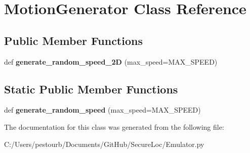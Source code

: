 \hypertarget{class_emulator_1_1_motion_generator}{}\section{Motion\+Generator Class Reference}
\label{class_emulator_1_1_motion_generator}
\subsection*{Public Member Functions}
\begin{DoxyCompactItemize}
\item 
\mbox{\label{class_emulator_1_1_motion_generator_ae846cfa9ceebef5acb7e1b8ea109f55a}} 
def {\bfseries generate\+\_\+random\+\_\+speed\+\_\+2D} (max\+\_\+speed=M\+A\+X\+\_\+\+S\+P\+E\+ED)
\end{DoxyCompactItemize}
\subsection*{Static Public Member Functions}
\begin{DoxyCompactItemize}
\item 
\mbox{\label{class_emulator_1_1_motion_generator_a40d631f14f6e500846c5fe23835ec6a4}} 
def {\bfseries generate\+\_\+random\+\_\+speed} (max\+\_\+speed=M\+A\+X\+\_\+\+S\+P\+E\+ED)
\end{DoxyCompactItemize}


The documentation for this class was generated from the following file\+:\begin{DoxyCompactItemize}
\item 
C\+:/\+Users/pestourb/\+Documents/\+Git\+Hub/\+Secure\+Loc/Emulator.\+py\end{DoxyCompactItemize}
